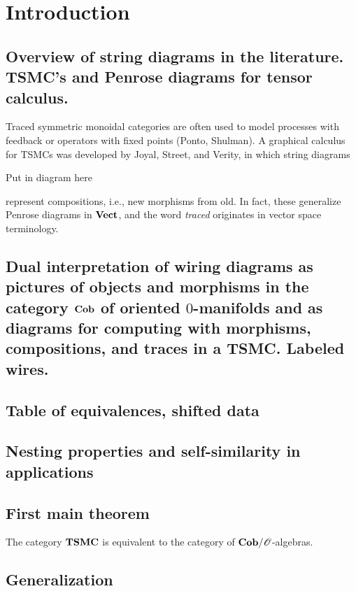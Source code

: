\chapter{Introduction}

\section{Overview of string diagrams in the literature. 
TSMC's and Penrose diagrams for tensor calculus.
}
Traced symmetric monoidal categories are often used to model processes with feedback or operators with fixed points (Ponto, Shulman). A graphical calculus for TSMCs was developed by Joyal, Street, and Verity, in which string diagrams
\begin{center}Put in diagram here\end{center}
represent compositions, i.e., new morphisms from old. In fact, these generalize Penrose diagrams in $\mathbf{Vect}$, and the word \emph{traced} originates in vector space terminology.  

\section{Dual interpretation of wiring diagrams as pictures of objects and morphisms in the category $\mathbf{Cob}$ of oriented $0$-manifolds and as diagrams for computing with morphisms, compositions, and traces in a TSMC.  Labeled wires.
}

\section{Table of equivalences, shifted data}

\section{Nesting properties and self-similarity in applications}

\section{First main theorem}

\begin{theorem}
 The category $\mathbf{TSMC}$ is equivalent to the category of $\mathbf{Cob}/\mathscr{O}$-algebras.
\end{theorem}

\section{Generalization}

